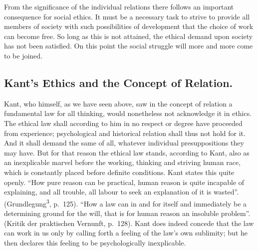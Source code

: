\documentclass[12pt]{article}
\newcommand{\opage}[1]{\marginnote{\footnotesize\textit{[#1]}}}
\begin{document}
From the significance of the individual relations there follows an \opage{92}important
consequence for social ethics. It must be a necessary task to strive to
provide all members of society with such possibilities of development that
the choice of work can become free. So long as this is not attained, the
ethical demand upon society has not been satisfied. On this point the social
struggle will more and more come to be joined.

\subsection{Kant's Ethics and the Concept of Relation.}
\label{sec:4e}

\noindent Kant, who himself, as we have seen above, saw in the concept of
relation a fundamental law for all thinking, would nonetheless not
acknowledge it in ethics. The ethical law shall according to him in no
respect or degree have proceeded from experience; psychological and
historical relation shall thus not hold for it. And it shall demand the same
of all, whatever individual presuppositions they may have. But for that
reason the ethical law stands, according to Kant, also as an inexplicable
marvel before the working, thinking and striving human race, which is
constantly placed before definite conditions. Kant states this quite openly.
``How pure reason can be practical, human reason is quite incapable of
explaining, and all trouble, all labour to seek an explanation of it is
wasted''. (Grundlegung\textsuperscript{3}, p.~125). ``How a law can in and
for itself and immediately be a determining ground for the will, that is for
human reason an insoluble problem''. (Kritik der praktischen Vernunft,
p.~128). Kant does indeed concede that the law can work in us only by
calling forth a feeling of the law's own sublimity; but he then declares
this feeling to be psychologically inexplicable.
\end{document}
